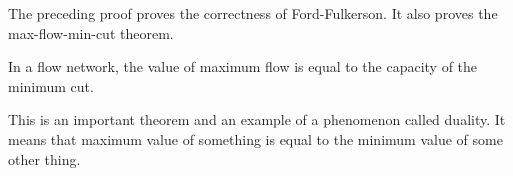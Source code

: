 The preceding proof proves the correctness of Ford-Fulkerson. It also proves the max-flow-min-cut theorem.

\begin{theorem}
	In a flow network, the value of maximum flow is equal to the capacity of the minimum cut.
\end{theorem}

This is an important theorem and an example of a phenomenon called duality. It means that maximum value of something is equal to the minimum value of some other thing.